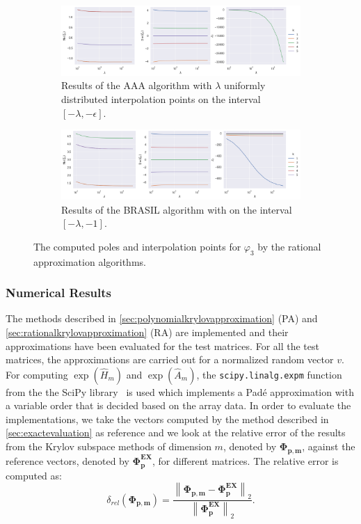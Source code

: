 \begin{figure}[h!]
    \centering
    \begin{subfigure}[b]{.9\textwidth}
        \includegraphics[width=\textwidth]{img/AAA/poles_linspace_aaa.png}
        \caption{
            Results of the AAA algorithm with $\lambda$ uniformly
            distributed interpolation points on the interval $[-\lambda, -\epsilon]$.
        }
        \label{fig:polesaaa}
    \end{subfigure}
    \begin{subfigure}[b]{.9\textwidth}
        \includegraphics[width=\textwidth]{img/AAA/poles_linspace_brasil.png}
        \caption{
            Results of the BRASIL algorithm with on the interval $[-\lambda, -1]$.
        }
        \label{fig:polesbrasil}
    \end{subfigure}
    \caption{
        The computed poles and interpolation points for $\varphi_3$ by the rational approximation algorithms.
    }
    \label{fig:poles}
\end{figure}


\subsubsection*{Numerical Results}
The methods described in \autoref{sec:polynomialkrylovapproximation} (PA)
and \autoref{sec:rationalkrylovapproximation} (RA)
are implemented and their approximations have been evaluated for the test matrices.
For all the test matrices, the approximations are carried out for a normalized
random vector $v$.
For computing $\exp(\hat{H}_m)$ and $\exp(\hat{A}_m)$, the \texttt{scipy.linalg.expm}
function from the the SciPy library~\cite{SciPy2020} is used which implements a Padé
approximation with a variable order that is decided based on the array data.
In order to evaluate the implementations, we take the vectors computed by the method
described in \autoref{sec:exactevaluation} as reference and we look at the relative
error of the results from the Krylov subspace methods of dimension $m$, denoted by
$\mathbf{\Phi_{p, m}}$, against the reference vectors, denoted by $\mathbf{\Phi_p^{EX}}$,
for different matrices. The relative error is computed as:
\begin{equation*}
    \delta_{rel}(\mathbf{\Phi_{p, m}}) =
    \frac{\left\| \mathbf{\Phi_{p, m}} - \mathbf{\Phi_p^{EX}} \right\|_2}
    {\left\| \mathbf{\Phi_p^{EX}} \right\|_2}.
\end{equation*}

